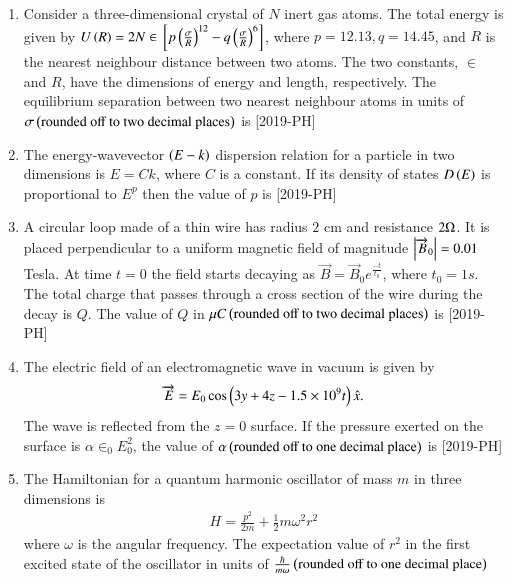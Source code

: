 \documentclass[journal]{IEEEtran}
\begin{document}
\begin{enumerate}[start=27]
\item Consider a three-dimensional crystal of $N$ inert gas atoms. The total energy is given by $U\left(R\right)=2N \in {}\left[p\left(\frac{\sigma}{R}\right)^{12}-q\left(\frac{\sigma}{R}\right)^{6}\right]$, where $p=12.13, q=14.45$, and $R$ is the nearest neighbour distance between two atoms. The two constants, $\in$ and $R$, have the dimensions of energy and length, respectively. The equilibrium separation between two nearest neighbour atoms in units of $\sigma \left(\text{rounded off to two decimal places}\right)$ is \underline{\hspace{1cm}} \hfill{[2019-PH]}\\
\item The energy-wavevector $\left(E-k\right)$ dispersion relation for a particle in two dimensions is $E=Ck$, where $C$ is a constant. If its density of states $D\left(E\right)$ is proportional to $E^p$ then the value of $p$ is \underline{\hspace{1cm}} \hfill{[2019-PH]}\\
\item A circular loop made of a thin wire has radius $2$ cm and resistance $2\ohm$. It is placed perpendicular to a uniform magnetic field of magnitude $\left\vert\overrightarrow{B}_0\right\vert=0.01$ Tesla. At time $t=0$ the field starts decaying as $\overrightarrow{B}=\overrightarrow{B}_0 e^{\frac{-t}{t_{0}}}$, where $t_{0}=1s$. The total charge that passes through a cross section of the wire during the decay is $Q$. The value of $Q$ in $\mu C \left(\text{rounded off to two decimal places}\right)$ is \underline{\hspace{1cm}} \hfill{[2019-PH]}\\
\item The electric field of an electromagnetic wave in vacuum is given by \\
\begin{align*}
    \overrightarrow{E}=E_{0} \cos \left(3y+4z-1.5 \times 10^{9} t\right) \hat{x}.
\end{align*}
The wave is reflected from the $z=0$ surface. If the pressure exerted on the surface is $\alpha\in_{0}E_0^{2}$, the value of $\alpha \left(\text{rounded off to one decimal place}\right)$ is  \underline{\hspace{1cm}} \hfill{[2019-PH]}\\
\item The Hamiltonian for a quantum harmonic oscillator of mass $m$ in three dimensions is \\
\begin{align*}
    H=\frac{p^{2}}{2m}+\frac{1}{2}m \omega^{2}r^{2}
\end{align*}
where $\omega$ is the angular frequency. The expectation value of $r^{2}$ in the first excited state of the oscillator in units of $\frac{\hbar}{m\omega} \left(\text{rounded off to one decimal place}\right)$



\end{enumerate}
\end{document}
